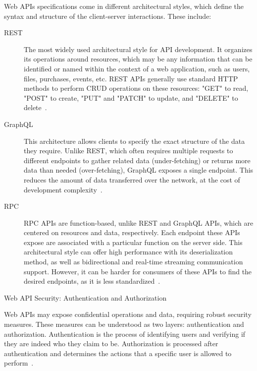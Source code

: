 \documentclass[12pt, reqno]{amsbook}
\makeatletter
\def\section{\@startsection{section}{1}%
      \z@{.5\linespacing\@plus.7\linespacing}{.25\linespacing}%
      {\normalfont\bfseries\flushleft}}
\theoremstyle{definition}
\theoremstyle{definition}
\numberwithin{section}{chapter}
\numberwithin{table}{chapter}
\numberwithin{figure}{chapter}
\makeatother
\begin{document}
Web \acp{API} specifications come in different architectural styles, which define the syntax and structure of the client-server interactions. These include:

\begin{description}
  \item [\ac{REST}] The most widely used architectural style for \ac{API} development. It organizes its operations around resources, which may be any information that can be identified or named within the context of a web application, such as users, files, purchases, events, etc. \ac{REST} \acp{API} generally use standard \ac{HTTP} methods to perform \ac{CRUD} operations on these resources: "GET" to read, "POST" to create, "PUT" and "PATCH" to update, and "DELETE" to delete~\cite{Neumann2021,Lauret2019, Suryotrisongko2017, Khozaimi2022}.
  \item [GraphQL] This architecture allows clients to specify the exact structure of the data they require. Unlike \ac{REST}, which often requires multiple requests to different endpoints to gather related data (under-fetching) or returns more data than needed (over-fetching), GraphQL exposes a single endpoint. This reduces the amount of data transferred over the network, at the cost of development complexity~\cite{Neumann2021,Lauret2019}.
  \item [\ac{RPC}] \ac{RPC} \acp{API} are function-based, unlike \ac{REST} and GraphQL \acp{API}, which are centered on resources and data, respectively. Each endpoint these \acp{API} expose are associated with a particular function on the server side. This architectural style can offer high performance with its deserialization method, as well as bidirectional and real-time streaming communication support. However, it can be harder for consumers of these \acp{API} to find the desired endpoints, as it is less standardized~\cite{Neumann2021,Lauret2019}.
\end{description}

\section{Web \texorpdfstring{\ac{API}}{API} Security: Authentication and Authorization}
\label{Section:Web_API_Security}

Web \acp{API} may expose confidential operations and data, requiring robust security measures. These measures can be understood as two layers: authentication and authorization.
Authentication is the process of identifying users and verifying if they are indeed who they claim to be. Authorization is processed after authentication and determines the actions that a specific user is allowed to perform~\cite{Gupta2024, deAlmeida2022}.
\end{document}
